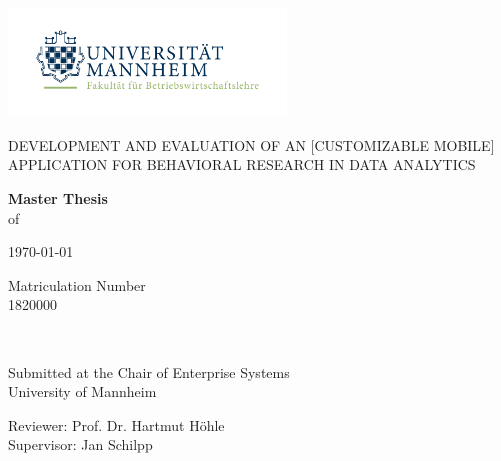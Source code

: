 \begin{titlepage}
	\centering

    \includegraphics[width=7.38cm]{template/logo_university_of_mannheim.png}\par

	\vspace{1.25cm}
	{\scshape\Large\uppercase{Development and Evaluation of an [Customizable Mobile] Application for Behavioral Research in Data Analytics}\par}
	
	\vspace{3cm}
	{\linespread{1}\normalsize \textbf{Master Thesis}\\
	 of  \par}
	
	{\large {}\par}
	
	\vspace{0.5cm}
	{\small \today \par}
	
	\vspace{0.3cm}
	{\footnotesize  Matriculation Number\\
	1820000\par}
	
	\vspace{2cm}
	\hrulefill\\	
	\vspace{1.0cm}
	{\linespread{1}\normalsize Submitted at the Chair of Enterprise Systems\\
	University of Mannheim\par}
	
	\vspace{0.3cm}
	{\linespread{1}\normalsize  Reviewer: Prof. Dr. Hartmut Höhle\\
	Supervisor: Jan Schilpp\par}


\end{titlepage}